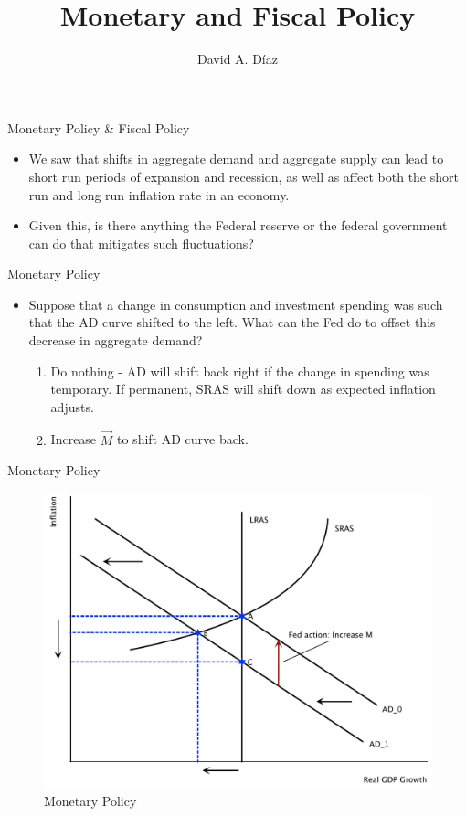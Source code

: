 \documentclass[xcolor={dvipsnames},pdf, hyperref={colorlinks=true, citecolor=ForestGreen, linkcolor=BlueViolet, urlcolor=Magenta}]{beamer}
\title{Monetary and Fiscal Policy}
\author{David A. D\'iaz}
\date{}
\theoremstyle{definition}
\begin{document}
 
	
	\begin{frame}
		
		\titlepage
		
	\end{frame}

\begin{frame}{Monetary Policy \& Fiscal Policy}
\begin{itemize}
	\item We saw that shifts in aggregate demand and aggregate supply can lead to short run periods of expansion and recession, as well as affect both the short run and long run inflation rate in an economy.
	\item Given this, is there anything the Federal reserve or the federal government can do that mitigates such fluctuations?
\end{itemize}
\end{frame}

\begin{frame}{Monetary Policy}
\begin{itemize}
\item Suppose that a change in consumption and investment spending was such that the AD curve shifted to the left. What can the Fed do to offset this decrease in aggregate demand?


\begin{enumerate}
	\item Do nothing - AD will shift back right if the change in spending was temporary. If permanent, SRAS will shift down as expected inflation adjusts.
	\item Increase $\vec{M}$ to shift AD curve back.
\end{enumerate}

\end{itemize}
			

\end{frame}

\begin{frame}{Monetary Policy}
\begin{figure}[H]
	\centering
	\includegraphics[scale=.40]{plot102.pdf}
	\caption{Monetary Policy}
\end{figure}
\end{frame}
\end{document}
